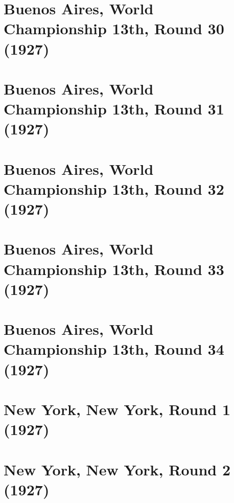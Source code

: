 \documentclass[11pt]{article}
\begin{document}
\clearpage

\section{Buenos Aires, World Championship 13th, Round 30 (1927)}


\clearpage

\section{Buenos Aires, World Championship 13th, Round 31 (1927)}


\clearpage

\section{Buenos Aires, World Championship 13th, Round 32 (1927)}


\clearpage

\section{Buenos Aires, World Championship 13th, Round 33 (1927)}


\clearpage

\section{Buenos Aires, World Championship 13th, Round 34 (1927)}


\clearpage

\section{New York, New York, Round 1 (1927)}


\clearpage



\clearpage



\clearpage



\clearpage



\clearpage

\section{New York, New York, Round 2 (1927)}

\end{document}
